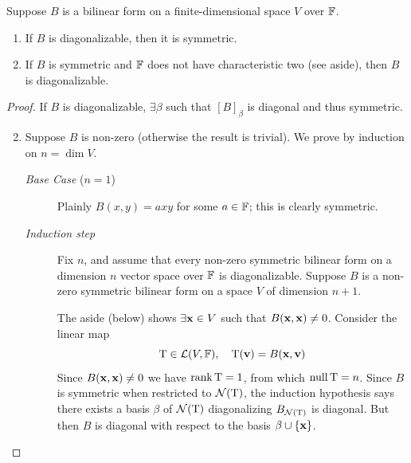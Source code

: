 \begin{thm}{}{}
	Suppose $B$ is a bilinear form on a finite-dimensional space $V$ over $\mathbb{F}$.
	\begin{enumerate}
	  \item If $B$ is diagonalizable, then it is symmetric.
	  \item If $B$ is symmetric and $\mathbb{F}$ does not have characteristic two (see aside), then $B$ is diagonalizable. 
	\end{enumerate}
\end{thm}

\begin{proof}
	\exstart If $B$ is diagonalizable, $\exists\beta$ such that $[B]_\beta$ is diagonal and thus symmetric.
	\begin{enumerate}\setcounter{enumi}{1}
	  \item Suppose $B$ is non-zero (otherwise the result is trivial). We prove by induction on $n=\dim V$.\vspace{-3pt}
	  \begin{description}
	  	\item[\normalfont\emph{Base Case} ($n=1$)] Plainly $B(x,y)=a xy$ for some $a\in \mathbb{F}$; this is clearly symmetric.
	  	\item[\normalfont\emph{Induction step}] Fix $n$, and assume that every non-zero symmetric bilinear form on a dimension $n$ vector space over $\mathbb{F}$ is diagonalizable. Suppose $B$ is a non-zero symmetric bilinear form on a space $V$ of dimension $n+1$.\par
	  	The aside (below) shows $\exists {\mathbf{x}}\in V$ such that $B({\mathbf{x}},{\mathbf{x}})\neq 0$. Consider the linear map
		\[
			\mathrm{T}\in\mathcal{L}(V,\mathbb{F}),\quad \mathrm{T}({\mathbf{v}})= B({\mathbf{x}},{\mathbf{v}})
		\]
		Since $B({\mathbf{x}},{\mathbf{x}})\neq 0$ we have $\operatorname{rank}\mathrm{T}=1$, from which $\operatorname{null}\mathrm{T}=n$. Since $B$ is symmetric when restricted to $\mathcal{N}(\mathrm{T})$, the induction hypothesis says there exists a basis $\beta$ of $\mathcal{N}(\mathrm{T})$ diagonalizing $B_{\mathcal{N}(\mathrm{T})}$ is diagonal. But then $B$ is diagonal with respect to the basis $\beta\cup\{{\mathbf{x}}\}$.\qedhere 
	  \end{description}
	\end{enumerate}
\end{proof}



